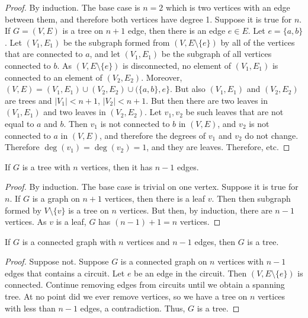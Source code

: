         \begin{proof}
            By induction. The base case is $n=2$ which is
            two vertices with an edge between them, and therefore
            both vertices have degree 1. Suppose it is true for $n$.
            If $G=(V,E)$ is a tree on $n+1$ edge, then there is
            an edge $e\in{E}$. Let $e=\{a,b\}$. Let
            $(V_{1},E_{1})$ be the subgraph formed from
            $(V,E\setminus\{e\})$ by all of the vertices that are
            connected to $a$, and let $(V_{1},E_{1})$ be the
            subgraph of all vertices connected to $b$. As
            $(V,E\setminus\{e\})$ is disconnected,
            no element of $(V_{1},E_{1})$ is connected to an element
            of $(V_{2},E_{2})$. Moreover,
            $(V,E)=(V_{1},E_{1})\cup(V_{2},E_{2})\cup(\{a,b\},e\}$.
            But also $(V_{1},E_{1})$ and $(V_{2},E_{2})$ are trees
            and $|V_{1}|<n+1$, $|V_{2}|<n+1$. But then there are
            two leaves in $(V_{1},E_{1})$ and two leaves in
            $(V_{2},E_{2})$. Let $v_{1},v_{2}$ be such leaves that
            are not equal to $a$ and $b$. Then
            $v_{1}$ is not connected to $b$ in $(V,E)$, and
            $v_{2}$ is not connected to $a$ in $(V,E)$, and therefore
            the degrees of $v_{1}$ and $v_{2}$ do not change.
            Therefore $\deg(v_{1})=\deg(v_{2})=1$, and they are
            leaves. Therefore, etc.
        \end{proof}
        \begin{theorem}
            If $G$ is a tree with $n$ vertices, then it has
            $n-1$ edges.
        \end{theorem}
        \begin{proof}
            By induction. The base case is trivial on one vertex.
            Suppose it is true for $n$. If $G$ is a graph on
            $n+1$ vertices, then there is a leaf $v$.
            Then then subgraph formed by
            $V\setminus\{v\}$ is a tree on $n$ vertices. But then,
            by induction, there are $n-1$ vertices. As $v$ is a leaf,
            $G$ has $(n-1)+1=n$ vertices.
        \end{proof}
        \begin{theorem}
            If $G$ is a connected graph with $n$ vertices and
            $n-1$ edges, then $G$ is a tree.
        \end{theorem}
        \begin{proof}
            Suppose not. Suppose $G$ is a connected graph
            on $n$ vertices with $n-1$ edges that contains a
            circuit. Let $e$ be an edge in the circuit.
            Then $(V,E\setminus\{e\})$ is connected. Continue removing
            edges from circuits until we obtain a spanning tree.
            At no point did we ever remove vertices, so we have
            a tree on $n$ vertices with less than $n-1$ edges,
            a contradiction. Thus, $G$ is a tree.
        \end{proof}
